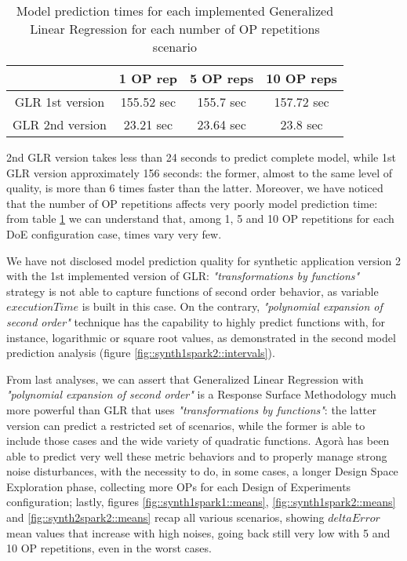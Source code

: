 \begin{table}[H]

    \centering
    
    \begin{tabular}{cccc}
    
        \toprule
         & 1 OP rep & 5 OP reps & 10 OP reps \\
        \midrule
        GLR 1st version & 155.52 sec & 155.7 sec & 157.72 sec \\
        GLR 2nd version & 23.21 sec & 23.64 sec & 23.8 sec \\
        \bottomrule 
    
    \end{tabular}

    \caption{Model prediction times for each implemented Generalized Linear Regression for each number of OP repetitions scenario}
    \label{tab::GLRtimes}
    
\end{table}

2nd GLR version takes less than 24 seconds to predict complete model, while 1st GLR version approximately 156 seconds: the former, almost to the same level of quality, is more than 6 times faster than the latter. Moreover, we have noticed that the number of OP repetitions affects very poorly model prediction time: from table \ref{tab::GLRtimes} we can understand that, among 1, 5 and 10 OP repetitions for each DoE configuration case, times vary very few.

We have not disclosed model prediction quality for synthetic application version 2 with the 1st implemented version of GLR: \textit{"transformations by functions"} strategy is not able to capture functions of second order behavior, as variable $executionTime$ is built in this case. On the contrary, \textit{"polynomial expansion of second order"} technique has the capability to highly predict functions with, for instance, logarithmic or square root values, as demonstrated in the second model prediction analysis (figure \ref{fig::synth1spark2::intervals}).

From last analyses, we can assert that Generalized Linear Regression with \textit{"polynomial expansion of second order"} is a Response Surface Methodology much more powerful than GLR that uses \textit{"transformations by functions"}: the latter version can predict a restricted set of scenarios, while the former is able to include those cases and the wide variety of quadratic functions. Agorà has been able to predict very well these metric behaviors and to properly manage strong noise disturbances, with the necessity to do, in some cases, a longer Design Space Exploration phase, collecting more OPs for each Design of Experiments configuration; lastly, figures \ref{fig::synth1spark1::means}, \ref{fig::synth1spark2::means} and \ref{fig::synth2spark2::means} recap all various scenarios, showing $deltaError$ mean values that increase with high noises, going back still very low with 5 and 10 OP repetitions, even in the worst cases.


